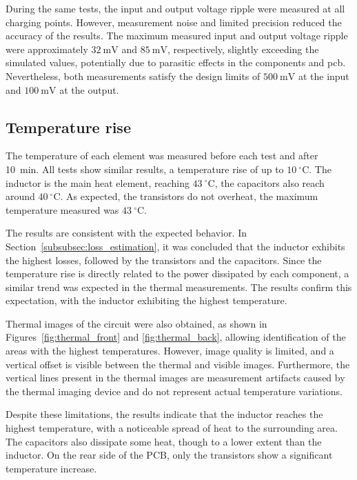         During the same tests, the input and output voltage ripple were measured at all charging points. However, measurement noise and limited precision reduced the accuracy of the results. The maximum measured input and output voltage ripple were approximately \(32~\mathrm{mV}\) and \(85~\mathrm{mV}\), respectively, slightly exceeding the simulated values, potentially due to parasitic effects in the components and \ac{pcb}. Nevertheless, both measurements satisfy the design limits of \(500~\mathrm{mV}\) at the input and \(100~\mathrm{mV}\) at the output. 

    \subsection{Temperature rise}
        The temperature of each element was measured before each test and after 10~min. All tests show similar results, a temperature rise of up to $10~^\circ\mathrm{C}$. The inductor is the main heat element, reaching $43~^\circ\mathrm{C}$, the capacitors also reach around $40~^\circ\mathrm{C}$. As expected, the transistors do not overheat, the maximum temperature measured was $43~^\circ\mathrm{C}$. 

        The results are consistent with the expected behavior. In Section~\ref{subsubsec:loss_estimation}, it was concluded that the inductor exhibits the highest losses, followed by the transistors and the capacitors. Since the temperature rise is directly related to the power dissipated by each component, a similar trend was expected in the thermal measurements. The results confirm this expectation, with the inductor exhibiting the highest temperature.

        Thermal images of the circuit were also obtained, as shown in Figures~\ref{fig:thermal_front} and \ref{fig:thermal_back}, allowing identification of the areas with the highest temperatures. However, image quality is limited, and a vertical offset is visible between the thermal and visible images. Furthermore, the vertical lines present in the thermal images are measurement artifacts caused by the thermal imaging device and do not represent actual temperature variations.

        Despite these limitations, the results indicate that the inductor reaches the highest temperature, with a noticeable spread of heat to the surrounding area. The capacitors also dissipate some heat, though to a lower extent than the inductor. On the rear side of the PCB, only the transistors show a significant temperature increase.


